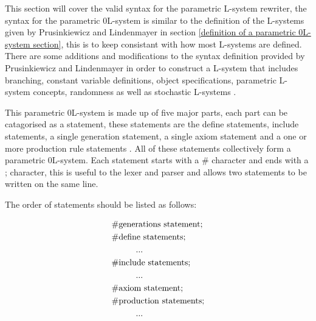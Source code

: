 \begin{flushleft}

This section will cover the valid syntax for the parametric L-system rewriter, the syntax for the parametric 0L-system is similar to the definition of the L-systems given by Prusinkiewicz and Lindenmayer in section \ref{definition of a parametric 0L-system section}, this is to keep consistant with how most L-systems are defined. There are some additions and modifications to the syntax definition provided by Prusinkiewicz and Lindenmayer in order to construct a L-system that includes branching, constant variable definitions, object specifications, parametric L-system concepts, randomness as well as stochastic L-systems \cite{prusinkiewicz2012algorithmic}. \\

\vspace{5mm}

This parametric 0L-system is made up of five major parts, each part can be catagorised as a statement, these statements are the define statements, include statements, a single generation statement, a single axiom statement and a one or more production rule statements \cite{prusinkiewicz2013lindenmayer}. All of these statements collectively form a parametric 0L-system. Each statement starts with a \# character and ends with a ; character, this is useful to the lexer and parser and allows two statements to be written on the same line. \\ 

\vspace{5mm}

The order of statements should be listed as follows: \\

\vspace{5mm}

\begin{equation} \label{statement order example}
\begin{aligned}
	&\text{\#generations statement;}\\
	&\text{\#define statements;}\\
	&\text{\hspace{10mm}...}\\
	&\text{\#include statements;}\\
	&\text{\hspace{10mm}...}\\
	&\text{\#axiom statement;}\\
	&\text{\#production statements;}\\
	&\text{\hspace{10mm}...}\\
\end{aligned}
\end{equation}


\end{flushleft}
